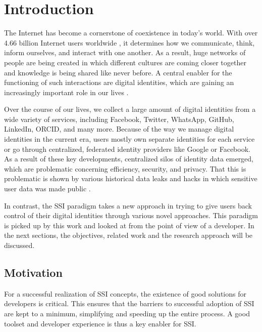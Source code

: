 \chapter{Introduction}
	The Internet has become a cornerstone of coexistence in today's world. With over 4.66 billion Internet users worldwide \cite{johnson_internet_2021}, it determines how we communicate, think, inform ourselves, and interact with one another.	As a result, huge networks of people are being created in which different cultures are coming closer together and knowledge is being shared like never before.
	A central enabler for the functioning of such interactions are digital identities, which are gaining an increasingly important role in our lives \cite{liu_blockchain-based_2020}.
	
	Over the course of our lives, we collect a large amount of digital identities from a wide variety of services, including Facebook, Twitter, WhatsApp, GitHub, LinkedIn, ORCID, and many more. Because of the way we manage digital identities in the current era, users mostly own separate identities for each service or go through centralized, federated identity providers like Google or Facebook. As a result of these key developments, centralized silos of identity data emerged, which are problematic concerning efficiency, security, and privacy. That this is problematic is shown by various historical data leaks and hacks in which sensitive user data was made public \cite{swinhoe_15_2021}. \cite{ehrlich_self-sovereign_2021}
	
	In contrast, the \ac{SSI} paradigm takes a new approach in trying to give users back control of their digital identities through various novel approaches. This paradigm is picked up by this work and looked at from the point of view of a developer. In the next sections, the objectives, related work and the research approach will be discussed.
	
	\section{Motivation} %
	
	For a successful realization of \acf{SSI} concepts, the existence of good solutions for developers is critical. This ensures that the barriers to successful adoption of \ac{SSI} are kept to a minimum, simplifying and speeding up the entire process. A good toolset and developer experience is thus a key enabler for \ac{SSI}.
	
